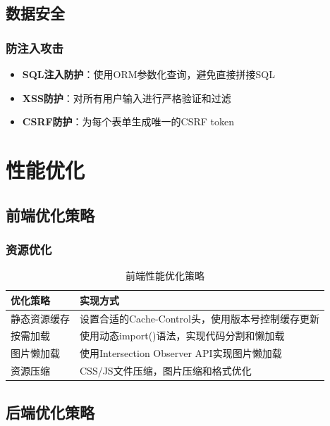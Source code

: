 \documentclass[a4paper]{article}
\begin{document}
\subsection{数据安全}

\subsubsection{防注入攻击}

\begin{itemize}
    \item \textbf{SQL注入防护}：使用ORM参数化查询，避免直接拼接SQL
    \item \textbf{XSS防护}：对所有用户输入进行严格验证和过滤
    \item \textbf{CSRF防护}：为每个表单生成唯一的CSRF token
\end{itemize}

\section{性能优化}

\subsection{前端优化策略}

\subsubsection{资源优化}

\begin{table}[H]
\centering
\begin{tabular}{|l|p{8cm}|}
\hline
\textbf{优化策略} & \textbf{实现方式} \\
\hline
静态资源缓存 & 设置合适的Cache-Control头，使用版本号控制缓存更新 \\
\hline
按需加载 & 使用动态import()语法，实现代码分割和懒加载 \\
\hline
图片懒加载 & 使用Intersection Observer API实现图片懒加载 \\
\hline
资源压缩 & CSS/JS文件压缩，图片压缩和格式优化 \\
\hline
\end{tabular}
\caption{前端性能优化策略}
\end{table}

\subsection{后端优化策略}
\end{document}
